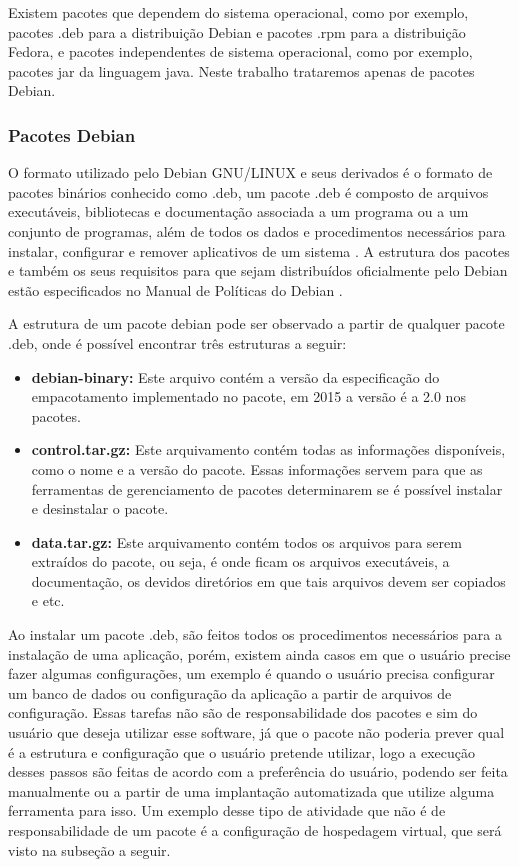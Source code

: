Existem pacotes que dependem do sistema operacional, como por exemplo, pacotes .deb
para a distribuição Debian e pacotes .rpm para a distribuição Fedora, e
pacotes independentes de sistema operacional, como por exemplo, pacotes jar da
linguagem java. Neste trabalho trataremos apenas de pacotes Debian.

\subsubsection{Pacotes Debian}

O formato utilizado pelo Debian GNU/LINUX e seus derivados é o formato de pacotes
binários conhecido como .deb, um pacote .deb é composto de arquivos executáveis,
bibliotecas e documentação associada a um programa ou a um conjunto de programas,
além de todos os dados e procedimentos necessários para instalar, configurar e remover
aplicativos de um sistema \cite{araujo2011apprecommender}. A estrutura dos pacotes
e também os seus requisitos para que sejam distribuídos oficialmente pelo Debian
estão especificados no Manual de Políticas do Debian \cite{debian}.

A estrutura de um pacote debian pode ser observado a partir de qualquer pacote
.deb, onde é possível encontrar três estruturas a seguir:

\begin{itemize}
  \item \textbf{debian-binary:} Este arquivo contém a versão da especificação
  do empacotamento implementado no pacote, em 2015 a versão é a 2.0 nos pacotes.
  \item \textbf{control.tar.gz:} Este arquivamento contém todas as informações
   disponíveis, como o nome e a versão do pacote. Essas informações servem para
   que as ferramentas de gerenciamento de pacotes determinarem se é possível
   instalar e desinstalar o pacote.
   \item \textbf{data.tar.gz:} Este arquivamento contém todos os arquivos para
   serem extraídos do pacote, ou seja, é onde ficam os arquivos executáveis, a documentação,
   os devidos diretórios em que tais arquivos devem ser copiados e etc.
\end{itemize}

Ao instalar um pacote .deb, são feitos todos os procedimentos necessários para a instalação
de uma aplicação, porém, existem ainda casos em que o usuário precise fazer algumas
configurações, um exemplo é quando o usuário precisa configurar um banco de dados
ou configuração da aplicação a partir de arquivos de configuração. Essas tarefas
não são de responsabilidade dos pacotes e sim do usuário que deseja utilizar esse
software, já que o pacote não poderia prever qual é a estrutura e configuração
que o usuário pretende utilizar, logo a execução desses passos são feitas de
acordo com a preferência do usuário, podendo ser feita manualmente ou a partir
de uma implantação automatizada que utilize alguma ferramenta para isso. Um exemplo
desse tipo de atividade que não é de responsabilidade de um pacote é a configuração
de hospedagem virtual, que será visto na subseção a seguir.


